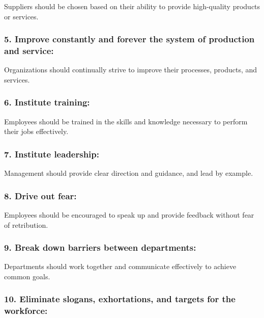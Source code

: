\documentclass[11pt]{article}
\begin{document}
Suppliers should be chosen based on their ability to provide
high-quality products or services.

\hypertarget{improve-constantly-and-forever-the-system-of-production-and-service}{%
\subsubsection{5. Improve constantly and forever the system of
production and
service:}\label{improve-constantly-and-forever-the-system-of-production-and-service}}

Organizations should continually strive to improve their processes,
products, and services.

\hypertarget{institute-training}{%
\subsubsection{6. Institute training:}\label{institute-training}}

Employees should be trained in the skills and knowledge necessary to
perform their jobs effectively.

\hypertarget{institute-leadership}{%
\subsubsection{7. Institute leadership:}\label{institute-leadership}}

Management should provide clear direction and guidance, and lead by
example.

\hypertarget{drive-out-fear}{%
\subsubsection{8. Drive out fear:}\label{drive-out-fear}}

Employees should be encouraged to speak up and provide feedback without
fear of retribution.

\hypertarget{break-down-barriers-between-departments}{%
\subsubsection{9. Break down barriers between
departments:}\label{break-down-barriers-between-departments}}

Departments should work together and communicate effectively to achieve
common goals.

\hypertarget{eliminate-slogans-exhortations-and-targets-for-the-workforce}{%
\subsubsection{10. Eliminate slogans, exhortations, and targets for the
workforce:}\label{eliminate-slogans-exhortations-and-targets-for-the-workforce}}
\end{document}
